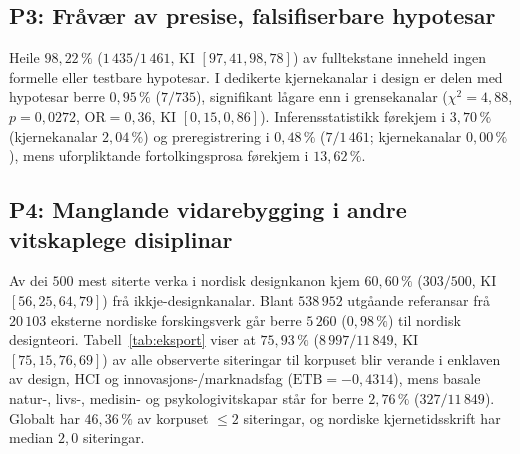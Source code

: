 \documentclass[11pt,a4paper]{article}
\begin{document}
\subsection{P3: Fråvær av presise, falsifiserbare hypotesar}
Heile $98{,}22\,\%$ ($1\,435/1\,461$, KI $[97{,}41, 98{,}78]$) av fulltekstane inneheld ingen formelle eller testbare hypotesar. I dedikerte kjernekanalar i design er delen med hypotesar berre $0{,}95\,\%$ ($7/735$), signifikant lågare enn i grensekanalar ($\chi^2 = 4{,}88$, $p = 0{,}0272$, $\mathrm{OR} = 0{,}36$, KI $[0{,}15, 0{,}86]$). Inferensstatistikk førekjem i $3{,}70\,\%$ (kjernekanalar $2{,}04\,\%$) og preregistrering i $0{,}48\,\%$ ($7/1\,461$; kjernekanalar $0{,}00\,\%$), mens uforpliktande fortolkingsprosa førekjem i $13{,}62\,\%$.

\subsection{P4: Manglande vidarebygging i andre vitskaplege disiplinar}
Av dei $500$ mest siterte verka i nordisk designkanon kjem $60{,}60\,\%$ ($303/500$, KI $[56{,}25, 64{,}79]$) frå ikkje-designkanalar. Blant $538\,952$ utgåande referansar frå $20\,103$ eksterne nordiske forskingsverk går berre $5\,260$ ($0{,}98\,\%$) til nordisk designteori. Tabell~\ref{tab:eksport} viser at $75{,}93\,\%$ ($8\,997/11\,849$, KI $[75{,}15, 76{,}69]$) av alle observerte siteringar til korpuset blir verande i enklaven av design, HCI og innovasjons-/marknadsfag ($\mathrm{ETB} = -0{,}4314$), mens basale natur-, livs-, medisin- og psykologivitskapar står for berre $2{,}76\,\%$ ($327/11\,849$). Globalt har $46{,}36\,\%$ av korpuset $\le 2$ siteringar, og nordiske kjernetidsskrift har median $2{,}0$ siteringar.
\end{document}
